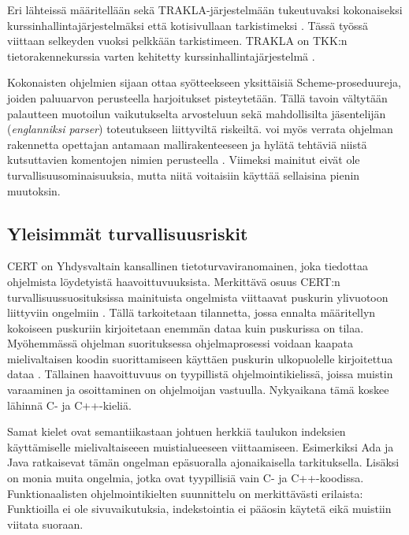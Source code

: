 Eri lähteissä {\scmrobo} määritellään sekä TRAKLA-järjestelmään 
tukeutuvaksi kokonaiseksi kurssinhallintajärjestelmäksi
\citep{saikkonen2001fully} että kotisivullaan tarkistimeksi
\citep{liljasaikkonen}. Tässä työssä viittaan selkeyden vuoksi pelkkään
tarkistimeen. TRAKLA on TKK:n tietorakennekurssia varten kehitetty
kurssinhallintajärjestelmä \citep{trakla}.

Kokonaisten ohjelmien sijaan {\scmrobo} ottaa syötteekseen yksittäisiä
Scheme-proseduureja, joiden paluuarvon perusteella harjoitukset pisteytetään.
Tällä tavoin vältytään palautteen muotoilun vaikutukselta arvosteluun sekä
mahdollisilta jäsentelijän (\emph{englanniksi parser}) toteutukseen liittyviltä
riskeiltä. {\scmrobo} voi myös verrata ohjelman rakennetta opettajan antamaan
mallirakenteeseen ja hylätä tehtäviä niistä kutsuttavien komentojen nimien
perusteella \citep{saikkonen2001fully}. Viimeksi mainitut eivät ole
turvallisuusominaisuuksia, mutta niitä voitaisiin käyttää sellaisina pienin
muutoksin.

\subsection{Yleisimmät turvallisuusriskit}

CERT on Yhdysvaltain kansallinen tietoturvaviranomainen, joka tiedottaa
ohjelmista löydetyistä haavoittuvuuksista.
Merkittävä osuus CERT:n turvallisuussuosituksissa mainituista ongelmista
viittaavat puskurin ylivuotoon liittyviin ongelmiin \citep{cert}. Tällä
tarkoitetaan tilannetta, jossa ennalta määritellyn
kokoiseen puskuriin kirjoitetaan enemmän dataa kuin puskurissa on tilaa.
Myöhemmässä ohjelman suorituksessa ohjelmaprosessi voidaan kaapata
mielivaltaisen koodin suorittamiseen käyttäen puskurin ulkopuolelle kirjoitettua
dataa \citep{tevis2004methods}. Tällainen haavoittuvuus on tyypillistä
ohjelmointikielissä, joissa muistin varaaminen ja osoittaminen on ohjelmoijan
vastuulla. Nykyaikana tämä koskee lähinnä C- ja C++-kieliä.

Samat kielet ovat semantiikastaan johtuen herkkiä taulukon indeksien
käyttämiselle mielivaltaiseeen muistialueeseen viittaamiseen. Esimerkiksi
Ada ja Java ratkaisevat tämän ongelman epäsuoralla ajonaikaisella
tarkituksella. Lisäksi on monia muita ongelmia, jotka ovat tyypillisiä vain
C- ja C++-koodissa. Funktionaalisten ohjelmointikielten suunnittelu on
merkittävästi erilaista: Funktioilla ei ole sivuvaikutuksia, indekstointia
ei pääosin käytetä eikä muistiin viitata suoraan. \citep{tevis2004methods}

